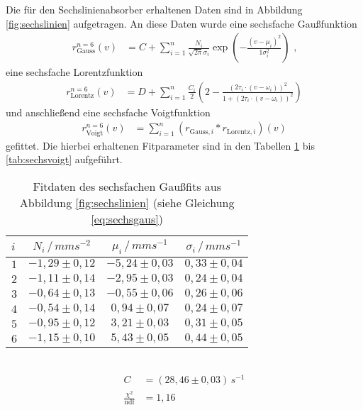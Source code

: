 Die für den Sechslinienabsorber erhaltenen Daten sind in Abbildung \ref{fig:sechslinien} aufgetragen. An diese Daten wurde eine sechsfache Gaußfunktion
\begin{align}
r_\mathrm{Gauss}^{n=6}(v)&=C+\sum_{i=1}^n\frac{N_i}{\sqrt{2\pi}\sigma_i}\exp(-\frac{(v-\mu_i)^2}{1\sigma_i^2})\text{ ,}\label{eq:sechsgaus}
\end{align}
eine sechsfache Lorentzfunktion 
\begin{align}
r_\mathrm{Lorentz}^{n=6}(v)&=D+\sum_{i=1}^n\frac{C_i}{2}\left(2-\frac{\left(2\tau_i\cdot(v-\omega_i)\right)^2}{1+\left(2\tau_i\cdot(v-\omega_i)\right)^2}\right)\label{eq:sechslorentz}
\end{align}
und anschließend eine sechsfache Voigtfunktion 
\begin{align}
r_\mathrm{Voigt}^{n=6}(v)&=\sum_{i=1}^n\left(r_{\mathrm{Gauss}, i}*r_{\mathrm{Lorentz}, i}\right)(v)\label{eq:sechsvoigt}
\end{align}
gefittet. Die hierbei erhaltenen Fitparameter sind in den Tabellen \ref{tab:sechsgaus} bis \ref{tab:sechsvoigt} aufgeführt.

\begin{table}[h!]
	\centering
	\begin{tabular}{l|ccc}
		$i$&$N_i\,/\,\si{mms^{-2}}$&$\mu_i\,/\,\si{mms^{-1}}$&$\sigma_i\,/\,\si{mms^{-1}}$\\\hline
		$1$&$-1,29\pm0,12$&$-5,24\pm0,03$&$0,33\pm0,04$\\
		$2$&$-1,11\pm0,14$&$-2,95\pm0,03$&$0,24\pm0,04$\\
		$3$&$-0,64\pm0,13$&$-0,55\pm0,06$&$0,26\pm0,06$\\
		$4$&$-0,54\pm0,14$&$ 0,94\pm0,07$&$0,24\pm0,07$\\
		$5$&$-0,95\pm0,12$&$ 3,21\pm0,03$&$0,31\pm0,05$\\
		$6$&$-1,15\pm0,10$&$ 5,43\pm0,05$&$0,44\pm0,05$\\
	\end{tabular}\\
	\begin{align*}
		C&=(28,46\pm0,03)\,\si{s^{-1}}\\
		\frac{\chi^2}{\mathrm{ndf}}&=1,16
	\end{align*}
	\caption{Fitdaten des sechsfachen Gaußfits aus Abbildung \ref{fig:sechslinien} (siehe Gleichung \ref{eq:sechsgaus})}
	\label{tab:sechsgaus}
\end{table}

